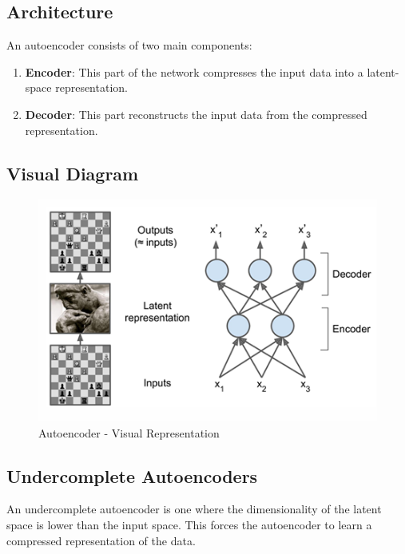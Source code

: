 \documentclass[
  letterpaper,
  DIV=11,
  numbers=noendperiod]{scrreprt}
\begin{document}
\subsection{Architecture}\label{architecture-1}

An autoencoder consists of two main components:

\begin{enumerate}
\def\labelenumi{\arabic{enumi}.}
\item
  \textbf{Encoder}: This part of the network compresses the input data
  into a latent-space representation.
\item
  \textbf{Decoder}: This part reconstructs the input data from the
  compressed representation.
\end{enumerate}

\subsection{Visual Diagram}\label{visual-diagram-3}

\begin{figure}[H]

{\centering \includegraphics[width=0.8\linewidth,height=\textheight,keepaspectratio]{chapter12_autoencoder.png}

}

\caption{Autoencoder - Visual Representation}

\end{figure}%

\subsection{Undercomplete
Autoencoders}\label{undercomplete-autoencoders}

An undercomplete autoencoder is one where the dimensionality of the
latent space is lower than the input space. This forces the autoencoder
to learn a compressed representation of the data.
\end{document}
